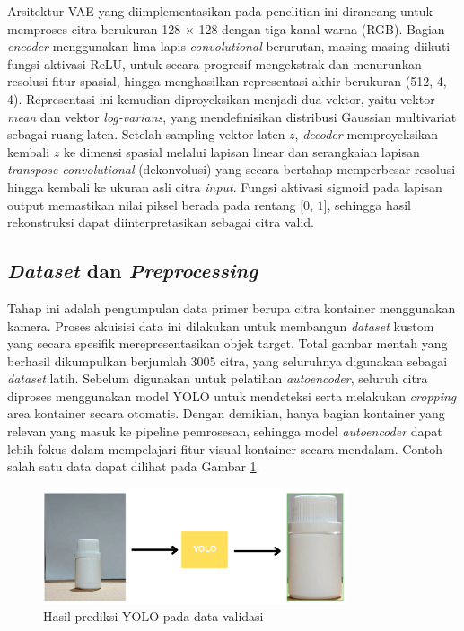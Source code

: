 Arsitektur VAE yang diimplementasikan pada penelitian ini dirancang
untuk memproses citra berukuran 128 $\times$ 128 dengan tiga kanal
warna (RGB). Bagian \textit{encoder} menggunakan lima lapis
\textit{convolutional} berurutan, masing-masing diikuti fungsi
aktivasi ReLU, untuk secara progresif mengekstrak dan menurunkan
resolusi fitur spasial, hingga menghasilkan representasi akhir
berukuran (512, 4, 4). Representasi ini kemudian diproyeksikan
menjadi dua vektor, yaitu vektor
\textit{mean} dan vektor \textit{log-varians}, yang mendefinisikan
distribusi Gaussian
multivariat sebagai ruang laten. Setelah sampling vektor laten $z$,
\textit{decoder} memproyeksikan kembali $z$ ke dimensi spasial melalui lapisan
linear dan serangkaian lapisan \textit{transpose convolutional}
(dekonvolusi) yang secara bertahap memperbesar resolusi hingga
kembali ke ukuran asli citra \textit{input}. Fungsi aktivasi sigmoid pada
lapisan output memastikan nilai piksel berada pada rentang $\text{[0, 1]}$,
sehingga hasil rekonstruksi dapat diinterpretasikan sebagai citra valid.

\vspace{1em}

\subsection{\textit{Dataset} dan \textit{Preprocessing}}
Tahap ini adalah pengumpulan data primer berupa
citra kontainer menggunakan kamera. Proses akuisisi data ini
dilakukan untuk membangun \textit{dataset} kustom yang secara spesifik
merepresentasikan objek target. Total gambar mentah yang berhasil
dikumpulkan berjumlah 3005 citra, yang seluruhnya digunakan sebagai
\textit{dataset} latih. Sebelum digunakan untuk pelatihan
\textit{autoencoder}, seluruh
citra diproses menggunakan model YOLO untuk mendeteksi serta
melakukan \textit{cropping} area kontainer
secara otomatis. Dengan demikian, hanya bagian kontainer yang relevan
yang masuk ke pipeline pemrosesan, sehingga model \textit{autoencoder} dapat
lebih fokus dalam mempelajari fitur visual kontainer secara mendalam.
Contoh salah satu data dapat dilihat pada Gambar \ref{fig:ae-data}.

\begin{figure}[H]
  \centering
  \includegraphics[width=0.8\textwidth]{gambar/ae_data.png}
  \caption{Hasil prediksi YOLO pada data validasi}
  \label{fig:ae-data}
\end{figure}
\vspace{-1em}

